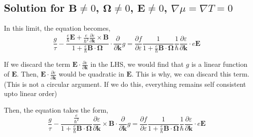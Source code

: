 \documentclass[aps,amsmath,prl]{revtex4-2}
\newcommand{\bvec}[1]{{\mathbf #1}}
\begin{document}

\subsection{Solution for $\bvec{B}\neq0$, $\bvec{\Omega}\neq 0$, $\bvec{E} \neq 0$, $\nabla \mu = \nabla T = 0$}

In this limit, the equation becomes,
$$
\frac{g}{\tau} -\frac{\frac{e}{\hbar} \bvec{E} +\frac{e}{\hbar^2} \frac{\partial \varepsilon}{\partial \bvec{k}} \times \bvec{B}}{1 + \frac{e}{\hbar} \bvec{B}\cdot\bvec{\Omega}} \cdot\frac{\partial}{\partial \bvec{k}} g = \frac{\partial f}{\partial \varepsilon}\frac{1}{1 + \frac{e}{\hbar} \bvec{B}\cdot\bvec{\Omega}}
\frac{1}{\hbar} \frac{\partial \varepsilon}{\partial \bvec{k}}\cdot e \bvec{E} $$

If we discard the term $\bvec{E} \cdot \frac{\partial \varepsilon}{\partial \bvec{k}}$ in the LHS, we would find that $g$ is a linear function of $\bvec{E}$. Then, $\bvec{E} \cdot \frac{\partial \varepsilon}{\partial \bvec{k}}$ would be quadratic in $\bvec{E}$. This is why, we can discard this term. (This is not a circular argument. If we do this, everything remains self consistent upto linear order)

Then, the equation takes the form,
\begin{equation}
\frac{g}{\tau} -\frac{\frac{e}{\hbar^2} }{1 + \frac{e}{\hbar} \bvec{B}\cdot\bvec{\Omega}} \frac{\partial \varepsilon}{\partial \bvec{k}} \times \bvec{B} \cdot\frac{\partial}{\partial \bvec{k}} g = \frac{\partial f}{\partial \varepsilon}\frac{1}{1 + \frac{e}{\hbar} \bvec{B}\cdot\bvec{\Omega}}
\frac{1}{\hbar} \frac{\partial \varepsilon}{\partial \bvec{k}}\cdot e \bvec{E}
\end{equation}~\label{Eq:BTE_zero_chem_pot_thermal_gradient}
\end{document}
